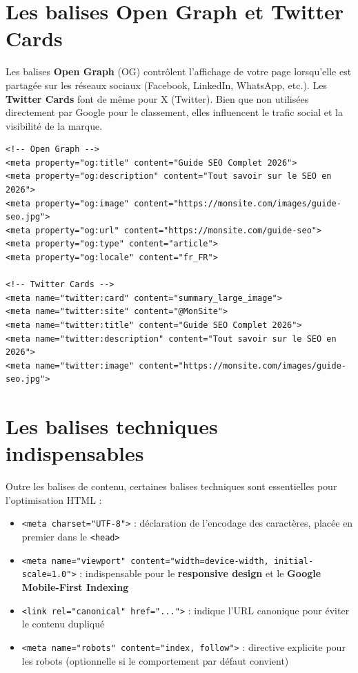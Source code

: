 \documentclass[12pt,a4paper,twoside]{report}
\newcommand{\keyword}[1]{\textbf{\textcolor{googleblue}{#1}}}
\begin{document}
\section{Les balises Open Graph et Twitter Cards}

Les balises \keyword{Open Graph} (OG) contrôlent l'affichage de votre page lorsqu'elle est partagée sur les réseaux sociaux (Facebook, LinkedIn, WhatsApp, etc.). Les \keyword{Twitter Cards} font de même pour X (Twitter). Bien que non utilisées directement par Google pour le classement, elles influencent le trafic social et la visibilité de la marque.

\begin{lstlisting}[style=htmlcode,caption={Balises Open Graph et Twitter Cards complètes}]
<!-- Open Graph -->
<meta property="og:title" content="Guide SEO Complet 2026">
<meta property="og:description" content="Tout savoir sur le SEO en 2026">
<meta property="og:image" content="https://monsite.com/images/guide-seo.jpg">
<meta property="og:url" content="https://monsite.com/guide-seo">
<meta property="og:type" content="article">
<meta property="og:locale" content="fr_FR">

<!-- Twitter Cards -->
<meta name="twitter:card" content="summary_large_image">
<meta name="twitter:site" content="@MonSite">
<meta name="twitter:title" content="Guide SEO Complet 2026">
<meta name="twitter:description" content="Tout savoir sur le SEO en 2026">
<meta name="twitter:image" content="https://monsite.com/images/guide-seo.jpg">
\end{lstlisting}

\section{Les balises techniques indispensables}

Outre les balises de contenu, certaines balises techniques sont essentielles pour l'optimisation HTML :

\begin{itemize}
    \item \texttt{<meta charset="UTF-8">} : déclaration de l'encodage des caractères, placée en premier dans le \texttt{<head>}
    \item \texttt{<meta name="viewport" content="width=device-width, initial-scale=1.0">} : indispensable pour le \keyword{responsive design} et le \keyword{Google Mobile-First Indexing}
    \item \texttt{<link rel="canonical" href="...">} : indique l'URL canonique pour éviter le contenu dupliqué
    \item \texttt{<meta name="robots" content="index, follow">} : directive explicite pour les robots (optionnelle si le comportement par défaut convient)
\end{itemize}
\end{document}
